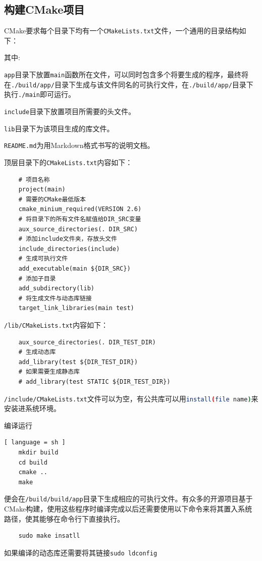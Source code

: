 	\subsection{构建CMake项目}
	\par CMake要求每个目录下均有一个\lstinline{CMakeLists.txt}文件，一个通用的目录结构如下：
	\par\noindent 其中:
	\par\noindent \lstinline{app}目录下放置\lstinline{main}函数所在文件，可以同时包含多个将要生成的程序，最终将在\lstinline{./build/app/}目录下生成与该文件同名的可执行文件，在\lstinline{./build/app/}目录下执行\lstinline{./main}即可运行。
	\par\noindent \lstinline{include}目录下放置项目所需要的头文件。
	\par\noindent \lstinline{lib}目录下为该项目生成的库文件。
	\par\noindent \lstinline{README.md}为用Markdown格式书写的说明文档。
	\par\noindent 顶层目录下的\lstinline{CMakeLists.txt}内容如下：
	\begin{lstlisting}
	# 项目名称
	project(main)
	# 需要的CMake最低版本
	cmake_minium_required(VERSION 2.6)
	# 将目录下的所有文件名赋值给DIR_SRC变量
	aux_source_directories(. DIR_SRC)
	# 添加include文件夹，存放头文件
	include_directories(include)
	# 生成可执行文件
	add_executable(main ${DIR_SRC})
	# 添加子目录
	add_subdirectory(lib)
	# 将生成文件与动态库链接
	target_link_libraries(main test)
	\end{lstlisting}
	\par\noindent \lstinline{/lib/CMakeLists.txt}内容如下：
	\begin{lstlisting}
	aux_source_directories(. DIR_TEST_DIR)
	# 生成动态库
	add_library(test ${DIR_TEST_DIR})
	# 如果需要生成静态库
	# add_library(test STATIC ${DIR_TEST_DIR})
	\end{lstlisting}
	\par\noindent \lstinline{/include/CMakeLists.txt}文件可以为空，有公共库可以用\lstinline[language=sh]{install(file name)}来安装进系统环境。
	\par\noindent 编译运行
	\begin{lstlisting}[ language = sh ]
	mkdir build
	cd build
	cmake ..
	make
	\end{lstlisting}
	\par\noindent 便会在\lstinline{/build/build/app}目录下生成相应的可执行文件。有众多的开源项目基于CMake构建，使用这些程序时编译完成以后还需要使用以下命令来将其置入系统路径，使其能够在命令行下直接执行。
	\begin{lstlisting}
	sudo make insatll
	\end{lstlisting}
	\par\noindent 如果编译的动态库还需要将其链接\lstinline{sudo ldconfig}
